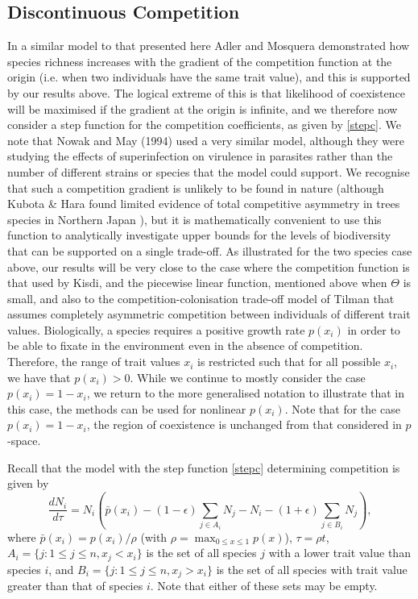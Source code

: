 \subsection{Discontinuous Competition}
In a similar model to that presented here Adler and Mosquera \cite{adler2000space} demonstrated how species richness increases with the gradient of the competition function at the origin (i.e. when two individuals have the same trait value), and this is supported by our results above. The logical extreme of this is that likelihood of coexistence will be maximised if the gradient at the origin is infinite, and we therefore now consider a step function for the competition coefficients, as given by \eqref{stepc}. We note that Nowak and May (1994) used a very similar model, although they were studying the effects of superinfection on virulence in parasites rather than the number of different strains or species that the model could support. We recognise that such a competition gradient is unlikely to be found in nature (although Kubota \& Hara found limited evidence of total competitive asymmetry in trees species in Northern Japan \cite{kubota1995tree}), but it is mathematically convenient to use this function to analytically investigate upper bounds for the  levels of biodiversity that can be supported on a single trade-off. As illustrated for the two species case above, our results will be very close to the case where the competition function is that used by Kisdi, and the piecewise linear function, mentioned above when $\Theta$ is small, and also to the competition-colonisation trade-off model of Tilman \cite{tilman1994competition} that assumes completely asymmetric competition between individuals of different trait values. Biologically, a species requires a positive growth rate $p(x_i)$ in order to be able to fixate in the environment even in the absence of competition. Therefore,  the range of trait values $x_i$ is restricted such that for all possible $x_i$, we have that $p(x_i)>0$. While we continue to mostly consider the case $p(x_i)=1-x_i$, we return to the more generalised notation to illustrate that in this case, the methods can be used for nonlinear $p(x_i)$. Note that for the case $p(x_i)=1-x_i$, the region of coexistence is unchanged from that considered in $p$-space.

Recall that the model with the step function \eqref{stepc} determining competition is given by
\begin{equation}
\label{rescaledmodel}
\frac{d N_i}{d\tau}=N_i\left(\bar{p}(x_i)-(1-\epsilon)\sum_{j\in A_i}N_j-N_i-(1+\epsilon)\sum_{j\in B_i}N_j\right),
\end{equation}
where $\bar{p}(x_i)=p(x_i)/\rho$ (with $\rho=\max_{0\leq x\leq 1} p(x)$), $\tau=\rho t$, $A_i=\{j:1\leq j\leq n,x_j<x_i\}$ is the set of all species $j$ with a lower trait value than species $i$, and $B_i=\{j:1\leq j\leq n,x_j>x_i\}$ is the set of all species with trait value greater than that of species $i$. Note that either of these sets may be empty. 

